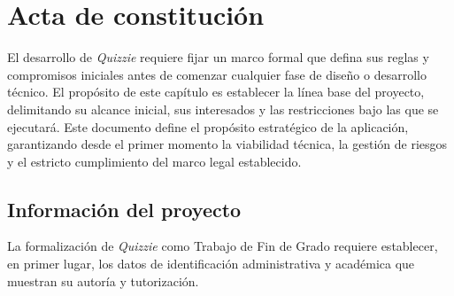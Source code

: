 \chapter{Acta de constitución}\label{cap:acta_de_constitucion}

El desarrollo de \textit{Quizzie} requiere fijar un marco formal que defina sus reglas y compromisos iniciales antes de comenzar cualquier fase de diseño o desarrollo técnico. El propósito de este capítulo es establecer la línea base del proyecto, delimitando su alcance inicial, sus interesados y las restricciones bajo las que se ejecutará. Este documento define el propósito estratégico de la aplicación, garantizando desde el primer momento la viabilidad técnica, la gestión de riesgos y el estricto cumplimiento del marco legal establecido.

\section{Información del proyecto}\label{sec:informacion_del_proyecto}

La formalización de \textit{Quizzie} como Trabajo de Fin de Grado requiere establecer, en primer lugar, los datos de identificación administrativa y académica que muestran su autoría y tutorización.

\begin{table}[H]
\centering
\small
\renewcommand{\arraystretch}{1.4}
\setlength{\tabcolsep}{12pt}
\caption{Datos de identificación del proyecto.}
\label{tab:datos_proyecto}
\end{table}

